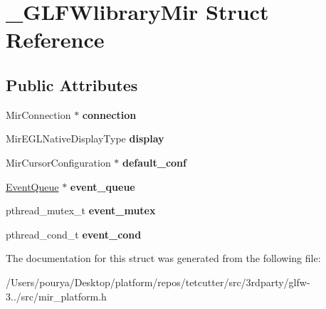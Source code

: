 \hypertarget{struct__GLFWlibraryMir}{}\section{\+\_\+\+G\+L\+F\+Wlibrary\+Mir Struct Reference}
\label{struct__GLFWlibraryMir}
\subsection*{Public Attributes}
\begin{DoxyCompactItemize}
\item 
\hypertarget{struct__GLFWlibraryMir_a3b1ce3216ea97b9812ccaaf5d631329f}{}Mir\+Connection $\ast$ {\bfseries connection}\label{struct__GLFWlibraryMir_a3b1ce3216ea97b9812ccaaf5d631329f}

\item 
\hypertarget{struct__GLFWlibraryMir_a27e50879dc4a35eb0d70de9b4110b9dd}{}Mir\+E\+G\+L\+Native\+Display\+Type {\bfseries display}\label{struct__GLFWlibraryMir_a27e50879dc4a35eb0d70de9b4110b9dd}

\item 
\hypertarget{struct__GLFWlibraryMir_a350c36a04462eea8e81fb3df7ad44f74}{}Mir\+Cursor\+Configuration $\ast$ {\bfseries default\+\_\+conf}\label{struct__GLFWlibraryMir_a350c36a04462eea8e81fb3df7ad44f74}

\item 
\hypertarget{struct__GLFWlibraryMir_a4457fb7797f9eaa82886205c88a02b85}{}\hyperlink{structEventQueue}{Event\+Queue} $\ast$ {\bfseries event\+\_\+queue}\label{struct__GLFWlibraryMir_a4457fb7797f9eaa82886205c88a02b85}

\item 
\hypertarget{struct__GLFWlibraryMir_a77a98d4265f14502bff70a5588d3fda5}{}pthread\+\_\+mutex\+\_\+t {\bfseries event\+\_\+mutex}\label{struct__GLFWlibraryMir_a77a98d4265f14502bff70a5588d3fda5}

\item 
\hypertarget{struct__GLFWlibraryMir_a6b9360ce88dea37a727254e63ae1fde7}{}pthread\+\_\+cond\+\_\+t {\bfseries event\+\_\+cond}\label{struct__GLFWlibraryMir_a6b9360ce88dea37a727254e63ae1fde7}

\end{DoxyCompactItemize}


The documentation for this struct was generated from the following file\+:\begin{DoxyCompactItemize}
\item 
/\+Users/pourya/\+Desktop/platform/repos/tetcutter/src/3rdparty/glfw-\/3../src/mir\+\_\+platform.\+h\end{DoxyCompactItemize}
